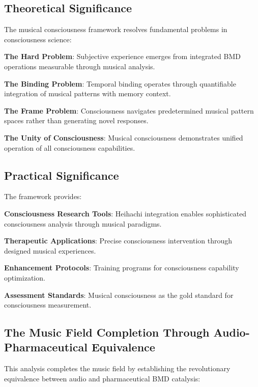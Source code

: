 \documentclass[12pt,a4paper]{article}
\begin{document}
\subsection{Theoretical Significance}

The musical consciousness framework resolves fundamental problems in consciousness science:

\textbf{The Hard Problem}: Subjective experience emerges from integrated BMD operations measurable through musical analysis.

\textbf{The Binding Problem}: Temporal binding operates through quantifiable integration of musical patterns with memory context.

\textbf{The Frame Problem}: Consciousness navigates predetermined musical pattern spaces rather than generating novel responses.

\textbf{The Unity of Consciousness}: Musical consciousness demonstrates unified operation of all consciousness capabilities.

\subsection{Practical Significance}

The framework provides:

\textbf{Consciousness Research Tools}: Heihachi integration enables sophisticated consciousness analysis through musical paradigms.

\textbf{Therapeutic Applications}: Precise consciousness intervention through designed musical experiences.

\textbf{Enhancement Protocols}: Training programs for consciousness capability optimization.

\textbf{Assessment Standards}: Musical consciousness as the gold standard for consciousness measurement.

\subsection{The Music Field Completion Through Audio-Pharmaceutical Equivalence}

This analysis completes the music field by establishing the revolutionary equivalence between audio and pharmaceutical BMD catalysis:
\end{document}
